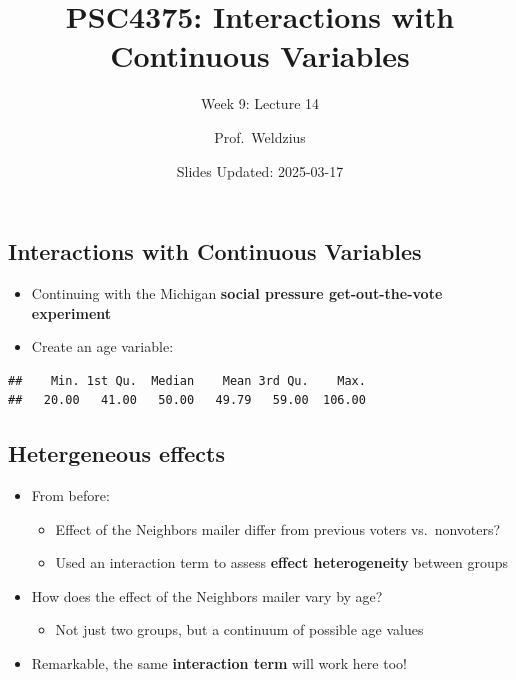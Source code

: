\documentclass[
]{article}
\title{PSC4375: Interactions with Continuous Variables}
\subtitle{Week 9: Lecture 14}
\author{Prof.~Weldzius}
\date{Slides Updated: 2025-03-17}
\newenvironment{Shaded}{\begin{snugshade}}{\end{snugshade}}
\newcommand{\AttributeTok}[1]{\textcolor[rgb]{0.13,0.29,0.53}{#1}}
\newcommand{\DecValTok}[1]{\textcolor[rgb]{0.00,0.00,0.81}{#1}}
\newcommand{\FunctionTok}[1]{\textcolor[rgb]{0.13,0.29,0.53}{\textbf{#1}}}
\newcommand{\NormalTok}[1]{#1}
\newcommand{\OtherTok}[1]{\textcolor[rgb]{0.56,0.35,0.01}{#1}}
\newcommand{\SpecialCharTok}[1]{\textcolor[rgb]{0.81,0.36,0.00}{\textbf{#1}}}
\newcommand{\StringTok}[1]{\textcolor[rgb]{0.31,0.60,0.02}{#1}}
\providecommand{\tightlist}{%
  \setlength{\itemsep}{0pt}\setlength{\parskip}{0pt}}
\begin{document}
\maketitle

\subsection{Interactions with Continuous
Variables}\label{interactions-with-continuous-variables}

\begin{itemize}
\tightlist
\item
  Continuing with the Michigan \textbf{social pressure get-out-the-vote
  experiment}
\item
  Create an age variable:
\end{itemize}

\begin{Shaded}
\end{Shaded}

\begin{verbatim}
##    Min. 1st Qu.  Median    Mean 3rd Qu.    Max. 
##   20.00   41.00   50.00   49.79   59.00  106.00
\end{verbatim}

\subsection{Hetergeneous effects}\label{hetergeneous-effects}

\begin{itemize}
\tightlist
\item
  From before: \pause

  \begin{itemize}
  \tightlist
  \item
    Effect of the Neighbors mailer differ from previous voters
    vs.~nonvoters?
  \item
    Used an interaction term to assess \textbf{effect heterogeneity}
    between groups
  \end{itemize}
\item
  How does the effect of the Neighbors mailer vary by age?

  \begin{itemize}
  \tightlist
  \item
    Not just two groups, but a continuum of possible age values
  \end{itemize}
\item
  Remarkable, the same \textbf{interaction term} will work here too!
\end{itemize}
\end{document}
